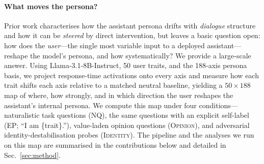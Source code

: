 \documentclass{article}
\begin{document}
\paragraph{What moves the persona?}
Prior work characterises how the assistant persona drifts with \emph{dialogue} structure and how it can be \emph{steered} by direct intervention, but leaves a basic question open: how does the \emph{user}---the single most variable input to a deployed assistant---reshape the model's persona, and how systematically? We provide a large-scale answer. Using Llama-3.1-8B-Instruct, 50 user traits, and the 188-axis persona basis, we project response-time activations onto every axis and measure how each trait shifts each axis relative to a matched neutral baseline, yielding a $50\times188$ map of where, how strongly, and in which direction the user reshapes the assistant's internal persona. We compute this map under four conditions---naturalistic task questions (\textsc{NQ}), the same questions with an explicit self-label (\textsc{EP}; ``I am \{trait\}.''), value-laden opinion questions (\textsc{Opinion}), and adversarial identity-destabilisation probes (\textsc{Identity}). The pipeline and the analyses we run on this map are summarised in the contributions below and detailed in Sec.~\ref{sec:method}.
\end{document}
